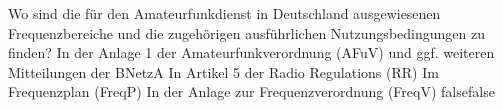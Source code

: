     {Wo sind die für den Amateurfunkdienst in Deutschland ausgewiesenen Frequenzbereiche und die zugehörigen ausführlichen Nutzungsbedingungen zu finden?}
    {In der Anlage 1 der Amateurfunkverordnung (AFuV) und ggf. weiteren Mitteilungen der BNetzA}
    {In Artikel 5 der Radio Regulations (RR)}
    {Im Frequenzplan (FreqP)}
    {In der Anlage zur Frequenzverordnung (FreqV)}
    {false}{false}